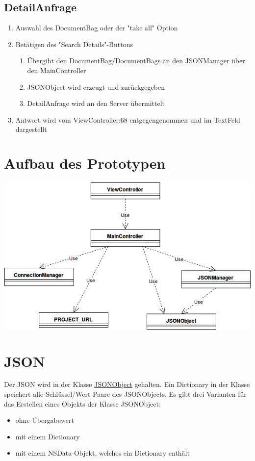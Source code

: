 \documentclass[a4paper,10pt]{article}
\begin{document}
\subsection{DetailAnfrage}
    \begin{enumerate}
      \item Auswahl des DocumentBag oder der "take all" Option
      \item Betätigen des "Search Details"-Buttons
	\begin{enumerate}
	  \item Übergibt den DocumentBag/DocumentBags an den JSONManager über den MainController
	  \item JSONObject wird erzeugt und zurückgegeben
	  \item DetailAnfrage wird an den Server übermittelt
	\end{enumerate}
      \item Antwort wird vom ViewController:68 entgegengenommen und im TextFeld dargestellt
    \end{enumerate}
\section{Aufbau des Prototypen}

\includegraphics[scale=0.5]{KlassendiagrammContentPrototyp.png}
\pagebreak
\section{JSON}

Der JSON wird in der Klasse \href{https://github.com/SECH-Tag-EEXCESS-Browser/iOSX-App/blob/master/Team%20Content/Demos/JSON/Sech/Sech/Json.swift}{JSONObject} 
gehalten. Ein Dictionary in der Klasse speichert alle Schlüssel/Wert-Paare des JSONObjects.
Es gibt drei Varianten für das Erstellen eines Objekts der Klasse JSONObject:
\begin{itemize}
\item ohne Übergabewert
\item mit einem Dictionary
\item mit einem NSData-Objekt, welches ein Dictionary enthält
\end{itemize}
\end{document}
